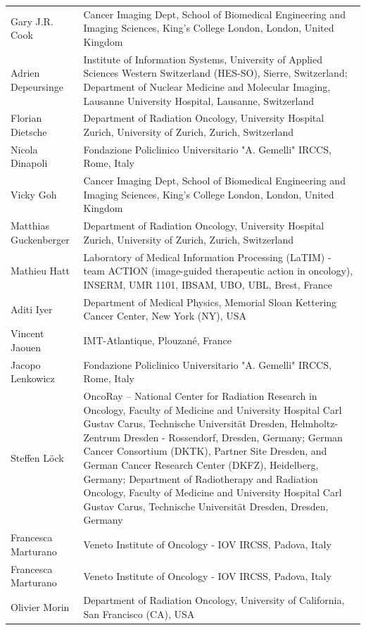 \documentclass[fleqn,a4paper,oneside,openany]{book}
\begin{document}
\begin{longtable}{p{4cm}p{10cm}}
Gary J.R. Cook
& Cancer Imaging Dept, School of Biomedical Engineering and Imaging Sciences, King’s College London, London, United Kingdom\\ 
Adrien Depeursinge
& Institute of Information Systems, University of Applied Sciences Western Switzerland (HES-SO), Sierre, Switzerland; Department of Nuclear Medicine and Molecular Imaging, Lausanne University Hospital, Lausanne, Switzerland\\ 
Florian Dietsche
& Department of Radiation Oncology, University Hospital Zurich, University of Zurich, Zurich, Switzerland\\ 
Nicola Dinapoli
& Fondazione Policlinico Universitario "A. Gemelli" IRCCS, Rome, Italy\\ 
Vicky Goh
& Cancer Imaging Dept, School of Biomedical Engineering and Imaging Sciences, King’s College London, London, United Kingdom\\ 
Matthias Guckenberger
& Department of Radiation Oncology, University Hospital Zurich, University of Zurich, Zurich, Switzerland\\ 
Mathieu Hatt
& Laboratory of Medical Information Processing (LaTIM) - team ACTION (image-guided therapeutic action in oncology), INSERM, UMR 1101, IBSAM, UBO, UBL, Brest, France\\ 
Aditi Iyer
& Department of Medical Physics, Memorial Sloan Kettering Cancer Center, New York (NY), USA\\ 
Vincent Jaouen
& IMT-Atlantique, Plouzané, France\\ 
Jacopo Lenkowicz
& Fondazione Policlinico Universitario "A. Gemelli" IRCCS, Rome, Italy\\ 
Steffen L{\"o}ck
& OncoRay – National Center for Radiation Research in Oncology, Faculty of Medicine and University Hospital Carl Gustav Carus, Technische Universität Dresden, Helmholtz-Zentrum Dresden - Rossendorf, Dresden, Germany; German Cancer Consortium (DKTK), Partner Site Dresden, and German Cancer Research Center (DKFZ), Heidelberg, Germany; Department of Radiotherapy and Radiation Oncology, Faculty of Medicine and University Hospital Carl Gustav Carus, Technische Universität Dresden, Dresden, Germany\\ 
Francesca Marturano & Veneto Institute of Oncology - IOV IRCSS, Padova, Italy\\
Francesca Marturano
& Veneto Institute of Oncology - IOV IRCSS, Padova, Italy\\
Olivier Morin
& Department of Radiation Oncology, University of California, San Francisco (CA), USA\\ 

\end{longtable}
\end{document}
